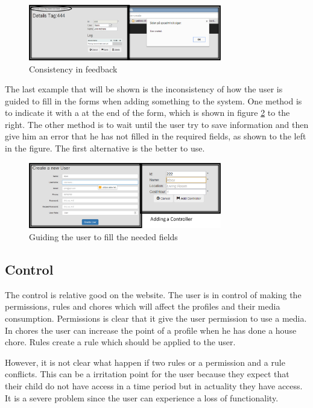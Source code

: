 \begin{figure}
	\centering
		\includegraphics[width=0.75\textwidth]{images/afteraddConsistency.png}
	\caption{Consistency in feedback}
	\label{fig:afteraddConsistency}
\end{figure}

The last example that will be shown is the inconsistency of how the user is guided to fill in the forms when adding something to the system. One method is to indicate it with a \* at the end of the form, which is shown in figure \ref{fig:consistencyAddControllerUser} to the right. The other method is to wait until the user try to save information and then give him an error that he has not filled in the required fields, as shown to the left in the figure. The first alternative is the better to use.

\begin{figure}
	\centering
		\includegraphics[width=0.75\textwidth]{images/consistencyAddControllerUser.png}
	\caption{Guiding the user to fill the needed fields}
	\label{fig:consistencyAddControllerUser}
\end{figure}

 
\subsection{Control}
The control is relative good on the website. The user is in control of making the permissions, rules and chores which will affect the profiles and their media consumption. Permissions is clear that it give the user permission to use a media. In chores the user can increase the point of a profile when he has done a house chore. Rules create a rule which should be applied to the user. 

However, it is not clear what happen if two rules or a permission and a rule conflicts. This can be a irritation point for the user because they expect that their child do not have access in a time period but in actuality they have access. It is a severe problem since the user can experience a loss of functionality.     

